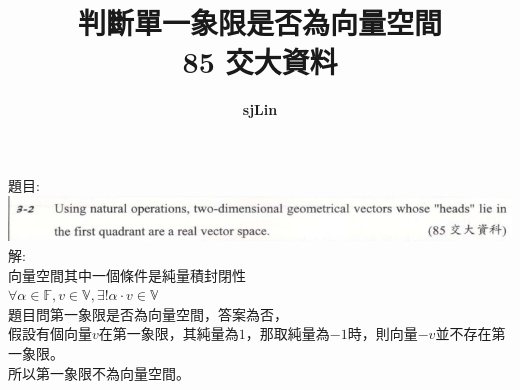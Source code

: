 \documentclass{article}
\title{判斷單一象限是否為向量空間\\85 交大資料}
\author{\textbf{sjLin}}
\begin{document}
\begin{CJK*}{UTF8}{bkai}
{\selectfont
\maketitle
\noindent
題目:\\
\includegraphics[width=\textwidth]{./images/quadrant_vector_space.png}
\\
解:\\
向量空間其中一個條件是純量積封閉性\\
$\forall \alpha\in\mathbb{F}, v\in\mathbb{V}, \exists!\alpha\cdot v\in\mathbb{V}$\\
題目問第一象限是否為向量空間，答案為否，\\
假設有個向量$v$在第一象限，其純量為$1$，那取純量為$-1$時，則向量$-v$並不存在第一象限。\\
所以第一象限不為向量空間。

} %
\end{CJK*}
\end{document}
